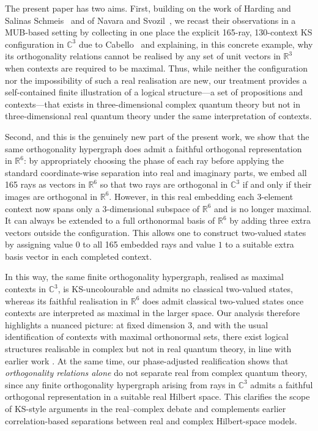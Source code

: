 \documentclass[%
  reprint,
  superscriptaddress,
  amsmath,amssymb,
  pra,
  floatfix,
  longbibliography
]{revtex4-2}
\begin{document}
The present paper has two aims. First, building on the work of Harding and
Salinas Schmeis~\cite{harding2025remarksIJTP} and of Navara and
Svozil~\cite{svozil-2025-MYOCHS}, we recast their observations in a
MUB-based setting by collecting in one place the explicit 165-ray,
130-context KS configuration in $\mathbb{C}^3$ due to Cabello~\cite{Cabello2025}
and explaining, in this concrete example, why its orthogonality relations
cannot be realised by any set of unit vectors in $\mathbb{R}^3$ when contexts are
required to be maximal. Thus, while neither the configuration nor the
impossibility of such a real realisation are new, our treatment provides a
self-contained finite illustration of a logical structure---a set of
propositions and contexts---that exists in three-dimensional complex quantum
theory but not in three-dimensional real quantum theory under the same
interpretation of contexts.

Second, and this is the genuinely new part of the present work, we show that
the same orthogonality hypergraph does admit a faithful orthogonal
representation~\cite{lovasz-79} in $\mathbb{R}^6$: by appropriately choosing the
phase of each ray before applying the standard coordinate-wise separation
into real and imaginary parts, we embed all 165 rays as vectors in $\mathbb{R}^6$
so that two rays are orthogonal in $\mathbb{C}^3$ if and only if their images are
orthogonal in $\mathbb{R}^6$. However, in this real embedding each 3-element
context now spans only a 3-dimensional subspace of $\mathbb{R}^6$ and is no longer
maximal. It can always be extended to a full orthonormal basis of $\mathbb{R}^6$
by adding three extra vectors outside the configuration. This allows one to
construct two-valued states by assigning value $0$ to all 165 embedded rays
and value $1$ to a suitable extra basis vector in each completed context.

In this way, the same finite orthogonality hypergraph, realised as maximal
contexts in $\mathbb{C}^3$, is KS-uncolourable and admits no classical two-valued
states, whereas its faithful realisation in $\mathbb{R}^6$ does admit classical
two-valued states once contexts are interpreted as maximal in the larger
space. Our analysis therefore highlights a nuanced picture: at fixed
dimension $3$, and with the usual identification of contexts with maximal
orthonormal sets, there exist logical structures realisable in complex but
not in real quantum theory, in line with earlier work
\cite{harding2025remarksIJTP,svozil-2025-MYOCHS}. At the same time, our
phase-adjusted realification shows that \emph{orthogonality relations
alone} do not separate real from complex quantum theory, since any finite
orthogonality hypergraph arising from rays in $\mathbb{C}^3$ admits a faithful
orthogonal representation in a suitable real Hilbert space. This clarifies
the scope of KS-style arguments in the real--complex debate and complements
earlier correlation-based separations between real and complex
Hilbert-space models.
\end{document}
